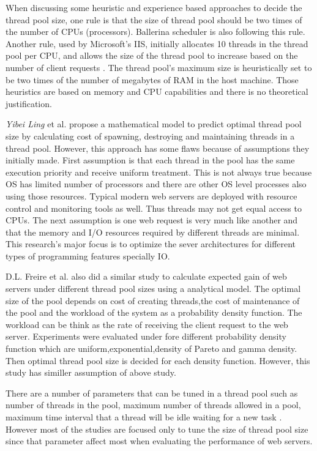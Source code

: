 When discussing some heuristic and experience based approaches to decide the thread pool size, one rule is that the size of thread pool should be two times of the number of CPUs (processors). Ballerina scheduler is also following this rule. Another rule, used by Microsoft's IIS, initially allocates 10 threads in the thread pool per CPU, and allows the size of the thread pool to increase based on the number of client requests \cite{thread_pool_analysis}. The thread pool's maximum size is heuristically set to be two times of the number of megabytes of RAM in the host machine. Those heuristics are based on memory and CPU capabilities and there is no theoretical justification.

\textit{Yibei Ling} et al. \cite{thread_pool_analysis} propose a mathematical model to predict optimal thread pool size  by calculating cost of spawning, destroying and maintaining threads in a thread pool. However, this approach has some flaws because of assumptions they initially made. First assumption is that each thread in the pool has the same execution priority and receive uniform treatment. This is not always true because OS has limited number of processors and there are other OS level processes also using those resources. Typical modern web servers are deployed with resource control and monitoring tools as well. Thus threads may not get equal access to CPUs. The next assumption is one web request is very much like another  and that the memory and I/O resources required by different threads are minimal. This research's major focus is to optimize the sever architectures for different types of programming features specially IO. 

D.L. Freire et al.\cite{math_aproach_thread_pool_tuning} also did a similar study to calculate expected gain of web servers under different thread pool sizes using a analytical model. The optimal size of the pool depends on cost of creating threads,the cost of maintenance of the pool and the workload of the system as a probability density function. The workload can be think as the rate of receiving the client request to the web server. Experiments were evaluated under fore different  probability density function which are uniform,exponential,density of Pareto and gamma density. Then optimal thread pool size is decided for each density function. However, this study has similler assumption of above study. 
 
There are a number of parameters that can be tuned in a thread pool such as number of threads in the pool, maximum number of threads allowed in a pool, maximum time interval that a thread will be idle waiting for a new task \cite{math_aproach_thread_pool_tuning}. However most of the studies are focused only to tune the size of thread pool size since that parameter affect most when evaluating the performance of web servers. 


